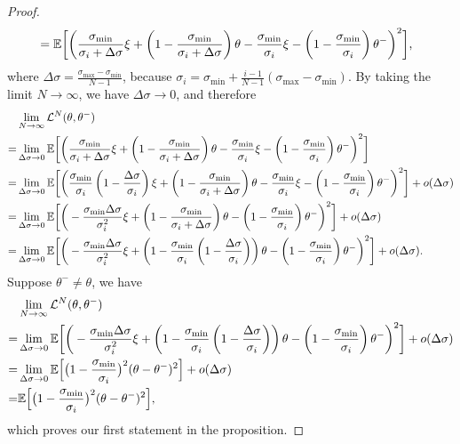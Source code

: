 \begin{proof}
\begin{align*}
    &=\mathbb{E}\bigg[\bigg(\frac{\sigma_\text{min}}{\sigma_i + \Delta \sigma}\xi + \left(1 - \frac{\sigma_\text{min}}{\sigma_i + \Delta \sigma}\right)\theta - \frac{\sigma_\text{min}}{\sigma_i}\xi - \left(1 - \frac{\sigma_\text{min}}{\sigma_i}\right)\theta^-\bigg)^2\bigg],
\end{align*}
where $\Delta \sigma = \frac{\sigma_\text{max} - \sigma_\text{min}}{N-1}$, because $\sigma_i = \sigma_\text{min} + \frac{i-1}{N-1}(\sigma_\text{max} - \sigma_\text{min})$. By taking the limit $N \to \infty$, we have $\Delta \sigma \to 0$, and therefore
\begin{align*}
    &\lim_{N\to\infty} \mathcal{L}^N(\theta, \theta^-) \\
    =& \lim_{\Delta \sigma \to 0} \mathbb{E}\bigg[\bigg(\frac{\sigma_\text{min}}{\sigma_i + \Delta \sigma}\xi + \left(1 - \frac{\sigma_\text{min}}{\sigma_i + \Delta \sigma}\right)\theta - \frac{\sigma_\text{min}}{\sigma_i}\xi - \left(1 - \frac{\sigma_\text{min}}{\sigma_i}\right)\theta^-\bigg)^2\bigg]\\
    =& \lim_{\Delta \sigma \to 0} \mathbb{E}\bigg[\bigg(\frac{\sigma_\text{min}}{\sigma_i}\left(1 - \frac{\Delta \sigma}{\sigma_i}\right)\xi + \left(1 - \frac{\sigma_\text{min}}{\sigma_i + \Delta \sigma}\right)\theta - \frac{\sigma_\text{min}}{\sigma_i}\xi - \left(1 - \frac{\sigma_\text{min}}{\sigma_i}\right)\theta^-\bigg)^2\bigg] + o(\Delta \sigma)\\
    =&\lim_{\Delta \sigma \to 0} \mathbb{E}\bigg[\bigg(-\frac{\sigma_\text{min}\Delta \sigma}{\sigma_i^2}\xi + \left(1 - \frac{\sigma_\text{min}}{\sigma_i + \Delta \sigma}\right)\theta - \left(1 - \frac{\sigma_\text{min}}{\sigma_i}\right)\theta^-\bigg)^2\bigg] + o(\Delta \sigma)\\
    =&\lim_{\Delta \sigma \to 0} \mathbb{E}\bigg[\bigg(-\frac{\sigma_\text{min}\Delta \sigma}{\sigma_i^2}\xi + \left(1 - \frac{\sigma_\text{min}}{\sigma_i}\left(1 - \frac{\Delta \sigma}{\sigma_i}\right)\right)\theta - \left(1 - \frac{\sigma_\text{min}}{\sigma_i}\right)\theta^-\bigg)^2\bigg] + o(\Delta \sigma).
\end{align*}
Suppose $\theta^{-}\neq \theta$, we have
\begin{align*}
    &\lim_{N\to\infty} \mathcal{L}^N(\theta, \theta^-) \\
    =&\lim_{\Delta \sigma \to 0} \mathbb{E}\bigg[\bigg(-\frac{\sigma_\text{min}\Delta \sigma}{\sigma_i^2}\xi + \left(1 - \frac{\sigma_\text{min}}{\sigma_i}\left(1 - \frac{\Delta \sigma}{\sigma_i}\right)\right)\theta - \left(1 - \frac{\sigma_\text{min}}{\sigma_i}\right)\theta^-\bigg)^2\bigg] + o(\Delta \sigma)\\
    =&\lim_{\Delta \sigma \to 0} \mathbb{E}\Big[ \big(1 - \frac{\sigma_\text{min}}{\sigma_i} \big)^2(\theta - \theta^{-})^2\Big]  + o(\Delta \sigma)\\
    =&\mathbb{E}\Big[ \big(1 - \frac{\sigma_\text{min}}{\sigma_i} \big)^2(\theta - \theta^{-})^2\Big],
\end{align*}
which proves our first statement in the proposition.


\end{proof}
